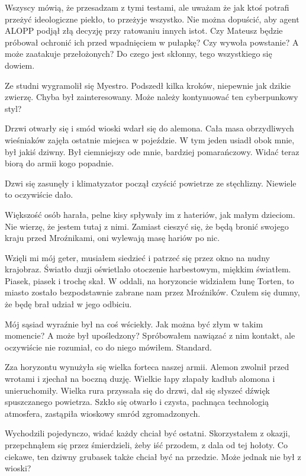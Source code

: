 Wszyscy mówią, że przesadzam z tymi testami, ale uważam że jak ktoś potrafi przeżyć ideologiczne piekło, to przeżyje wszystko.
Nie można dopuścić, aby agent ALOPP podjął złą decyzję przy ratowaniu innych istot.
Czy Mateusz będzie próbował ochronić ich przed wpadnięciem w pułapkę?
Czy wywoła powstanie?
A może zaatakuje przełożonych?
Do czego jest skłonny, tego wszystkiego się dowiem.

\divider{}

Ze studni wygramolił się Myestro.
Podszedł kilka kroków, niepewnie jak dzikie zwierzę.
Chyba był zainteresowany. Może należy kontynuować ten cyberpunkowy styl?

\divider{}

Drzwi otwarły się i smód wioski wdarł się do alemona.
Cała masa obrzydliwych wieśniaków zajęła ostatnie miejsca w pojeździe.
W tym jeden usiadł obok mnie, był jakiś dziwny.
Był ciemniejszy ode mnie, bardziej pomarańczowy.
Widać teraz biorą do armii kogo popadnie.

Dzwi się zasunęły i klimatyzator począł czyścić powietrze ze stęchlizny. Niewiele to oczywiście dało.

Większość osób harała, pelne kisy spływały im z hateriów, jak małym dzieciom.
Nie wierzę, że jestem tutaj z nimi. Zamiast cieszyć się, że będą bronić swojego kraju przed Mroźnikami, oni wylewają masę hariów po nic.

Wzięli mi mój geter, musiałem siedzieć i patrzeć się przez okno na nudny krajobraz.
Światło duzji oświetlało otoczenie harbestowym, miękkim światłem.
Piasek, piasek i trochę skał.
W oddali, na horyzoncie widziałem łunę Torten, to miasto zostało bezpodstawnie zabrane nam przez Mroźników.
Czułem się dumny, że będę brał udział w jego odbiciu.

Mój sąsiad wyraźnie był na coś wściekły. 
Jak można być złym w takim momencie?
A może był upośledzony?
Spróbowałem nawiązać z nim kontakt, ale oczywiście nie rozumiał, co do niego mówiłem.
Standard.

Zza horyzontu wynużyła się wielka forteca naszej armii.
Alemon zwolnił przed wrotami i zjechał na boczną duzję. 
Wielkie łapy złapały kadłub alomona i unieruchomiły.
Wielka rura przyssała się do drzwi, dał się słyszeć dźwięk spuszczanego powietrza.
Szkło się otwarło i czysta, pachnąca technologią atmosfera, zastąpiła wioskowy smród zgromadzonych.

Wychodzili pojedynczo, widać każdy chciał być ostatni.
Skorzystałem z okazji, przepchnąłem się przez śmierdzieli, żeby iść przodem, z dala od tej hołoty.
Co ciekawe, ten dziwny grubasek także chciał być na przedzie. Może jednak nie był z wioski?

